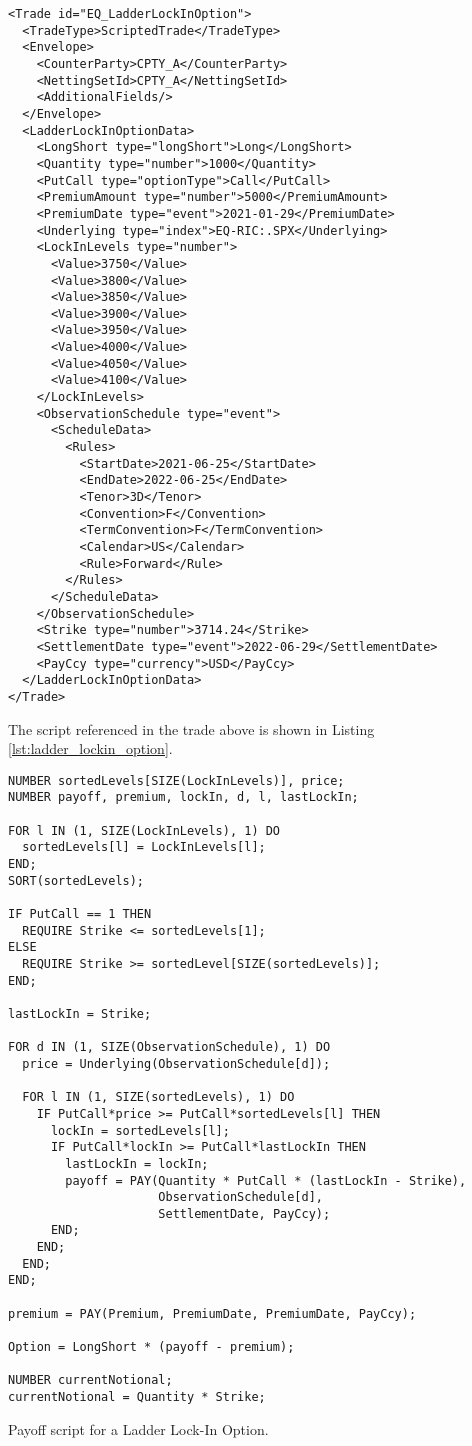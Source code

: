 \begin{verbatim} 
<Trade id="EQ_LadderLockInOption">
  <TradeType>ScriptedTrade</TradeType>
  <Envelope>
    <CounterParty>CPTY_A</CounterParty>
    <NettingSetId>CPTY_A</NettingSetId>
    <AdditionalFields/>
  </Envelope>
  <LadderLockInOptionData>
    <LongShort type="longShort">Long</LongShort>
    <Quantity type="number">1000</Quantity>
    <PutCall type="optionType">Call</PutCall>
    <PremiumAmount type="number">5000</PremiumAmount>
    <PremiumDate type="event">2021-01-29</PremiumDate>
    <Underlying type="index">EQ-RIC:.SPX</Underlying>
    <LockInLevels type="number">
      <Value>3750</Value>
      <Value>3800</Value>
      <Value>3850</Value>
      <Value>3900</Value>
      <Value>3950</Value>
      <Value>4000</Value>
      <Value>4050</Value>
      <Value>4100</Value>
    </LockInLevels>
    <ObservationSchedule type="event">
      <ScheduleData>
        <Rules>
          <StartDate>2021-06-25</StartDate>
          <EndDate>2022-06-25</EndDate>
          <Tenor>3D</Tenor>
          <Convention>F</Convention>
          <TermConvention>F</TermConvention>
          <Calendar>US</Calendar>
          <Rule>Forward</Rule>
        </Rules>
      </ScheduleData>
    </ObservationSchedule>
    <Strike type="number">3714.24</Strike>
    <SettlementDate type="event">2022-06-29</SettlementDate>
    <PayCcy type="currency">USD</PayCcy>
  </LadderLockInOptionData>
</Trade>
\end{verbatim} 
 
The script referenced in the trade above is shown in Listing \ref{lst:ladder_lockin_option}.
 
\begin{listing}[hbt] 
\begin{verbatim} 
NUMBER sortedLevels[SIZE(LockInLevels)], price;
NUMBER payoff, premium, lockIn, d, l, lastLockIn;

FOR l IN (1, SIZE(LockInLevels), 1) DO
  sortedLevels[l] = LockInLevels[l];
END;
SORT(sortedLevels);

IF PutCall == 1 THEN
  REQUIRE Strike <= sortedLevels[1];
ELSE
  REQUIRE Strike >= sortedLevel[SIZE(sortedLevels)];
END;

lastLockIn = Strike;

FOR d IN (1, SIZE(ObservationSchedule), 1) DO
  price = Underlying(ObservationSchedule[d]);

  FOR l IN (1, SIZE(sortedLevels), 1) DO
    IF PutCall*price >= PutCall*sortedLevels[l] THEN
      lockIn = sortedLevels[l];
      IF PutCall*lockIn >= PutCall*lastLockIn THEN
        lastLockIn = lockIn;
        payoff = PAY(Quantity * PutCall * (lastLockIn - Strike),
                     ObservationSchedule[d],
                     SettlementDate, PayCcy);
      END;
    END;
  END;
END;

premium = PAY(Premium, PremiumDate, PremiumDate, PayCcy);

Option = LongShort * (payoff - premium);

NUMBER currentNotional;
currentNotional = Quantity * Strike;
\end{verbatim} 
\caption{Payoff script for a Ladder Lock-In Option.} 
\label{lst:ladder_lockin_option} 
\end{listing} 
 
